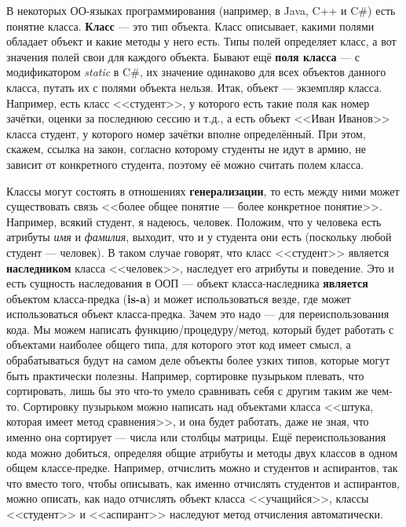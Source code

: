 \documentclass{../../text-style}
\begin{document}
В некоторых ОО-языках программирования (например, в Java, C++ и C\#) есть понятие класса. \textbf{Класс} --- это тип объекта. Класс описывает, какими полями обладает объект и какие методы у него есть. Типы полей определяет класс, а вот значения полей свои для каждого объекта. Бывают ещё \textbf{поля класса} --- с модификатором \textit{static} в C\#, их значение одинаково для всех объектов данного класса, путать их с полями объекта нельзя. Итак, объект --- экземпляр класса. Например, есть класс <<студент>>, у которого есть такие поля как номер зачётки, оценки за последнюю сессию и т.д., а есть объект <<Иван Иванов>> класса студент, у которого номер зачётки вполне определённый. При этом, скажем, ссылка на закон, согласно которому студенты не идут в армию, не зависит от конкретного студента, поэтому её можно считать полем класса.

Классы могут состоять в отношениях \textbf{генерализации}, то есть между ними может существовать связь <<более общее понятие --- более конкретное понятие>>. Например, всякий студент, я надеюсь, человек. Положим, что у человека есть атрибуты \textit{имя} и \textit{фамилия}, выходит, что и у студента они есть (поскольку любой студент --- человек). В таком случае говорят, что класс <<студент>> является \textbf{наследником} класса <<человек>>, наследует его атрибуты и поведение. Это и есть сущность наследования в ООП --- объект класса-наследника \textbf{является} объектом класса-предка (\textbf{is-a}) и может использоваться везде, где может использоваться объект класса-предка. Зачем это надо --- для переиспользования кода. Мы можем написать функцию/процедуру/метод, который будет работать с объектами наиболее общего типа, для которого этот код имеет смысл, а обрабатываться будут на самом деле объекты более узких типов, которые могут быть практически полезны. Например, сортировке пузырьком плевать, что сортировать, лишь бы это что-то умело сравнивать себя с другим таким же чем-то. Сортировку пузырьком можно написать над объектами класса <<штука, которая имеет метод сравнения>>, и она будет работать, даже не зная, что именно она сортирует --- числа или столбцы матрицы. Ещё переиспользования кода можно добиться, определяя общие атрибуты и методы двух классов в одном общем классе-предке. Например, отчислить можно и студентов и аспирантов, так что вместо того, чтобы описывать, как именно отчислять студентов и аспирантов, можно описать, как надо отчислять объект класса <<учащийся>>, классы <<студент>> и <<аспирант>> наследуют метод отчисления автоматически. 
\end{document}
